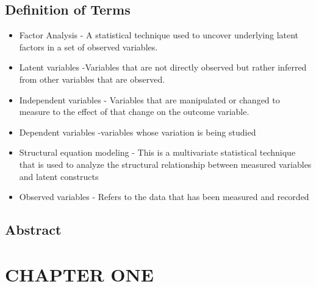 \documentclass{article}
\begin{document}
\subsection{Definition of Terms}
\begin{itemize}
\item Factor Analysis - A statistical technique used to uncover underlying latent factors in a set of observed variables. 
\item Latent variables -Variables that are not directly observed but rather inferred from other variables that are observed.
\item Independent variables - Variables that are manipulated or changed to measure to the effect of that change on the outcome variable.
\item Dependent variables -variables whose variation is being studied
\item Structural equation modeling - This is a multivariate statistical technique that is used to analyze the structural relationship between measured variables and latent constructs
\item Observed variables - Refers to the data that has been measured and recorded
\end{itemize}

\newpage
\subsection{Abstract}

\clearpage


\section*{CHAPTER ONE}
\end{document}
